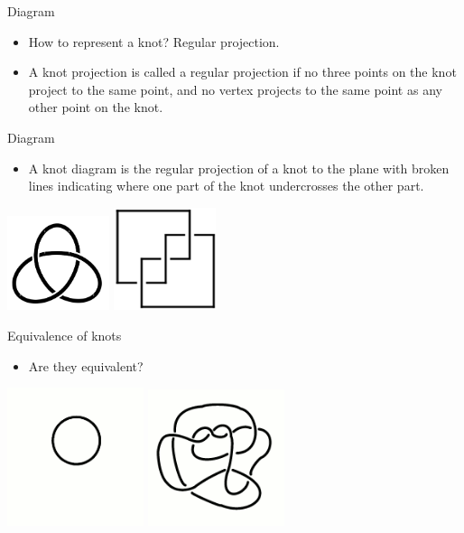 \begin{frame}{Diagram}
\begin{itemize}
    \item How to represent a knot? Regular projection.
\end{itemize}
\begin{itemize}
    \item A knot projection is called a regular projection if no three points on the knot project to the same point, and no vertex
projects to the same point as any other point on the knot.
\end{itemize}
\end{frame}

\begin{frame}{Diagram}

\begin{itemize}
    \item A knot diagram is the regular projection of a knot to the plane with broken
lines indicating where one part of the knot undercrosses the other part.
\end{itemize}
\centering
\includegraphics[width=3cm]{Pictures/trefoil.png}
\includegraphics[width=3cm]{Pictures/31.png}
\end{frame}

\begin{frame}{Equivalence of knots}
\begin{itemize}
    \item Are they equivalent?
\end{itemize}
\centering
    \includegraphics[width = 4cm]{Pictures/Simple.png}
    \includegraphics[width = 4cm]{Pictures/complex.png}
\end{frame}


